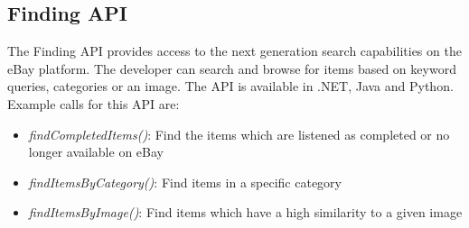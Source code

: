 \subsection{Finding API}
The Finding API provides access to the next generation search capabilities on the eBay platform. The developer can search and browse for items based on keyword queries, categories or an image. The API is available in .NET, Java and Python. Example calls for this API are:
\begin{itemize}
	\item \textit{findCompletedItems()}: Find the items which are listened as completed or no longer available on eBay
	\item \textit{findItemsByCategory()}: Find items in a specific category
	\item \textit{findItemsByImage()}: Find items which have a high similarity to a given image
\end{itemize}

